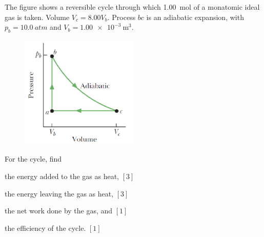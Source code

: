 \begin{problem}
    The figure shows a reversible cycle through which \qty{1.00}{mol} of a monatomic ideal gas is taken. Volume $V_c = 8.00V_b$. Process $bc$ is an adiabatic expansion, with $p_b = \qty{10.0}{atm}$ and $V_b = \qty{1.00e-3}{\m^3}$. 
    \begin{figure}[H]
        \centering
        \includegraphics[width=0.5\textwidth]{spho_book_TYS_images/2021SPhO_8.png}
    \end{figure}
    
    For the cycle, find
    \begin{subproblemalph}
        \item the energy added to the gas as heat, \hfill $[3]$
        \item the energy leaving the gas as heat, \hfill $[3]$
        \item the net work done by the gas, and \hfill $[1]$
        \item the efficiency of the cycle. \hfill $[1]$
    \end{subproblemalph}
\end{problem}

